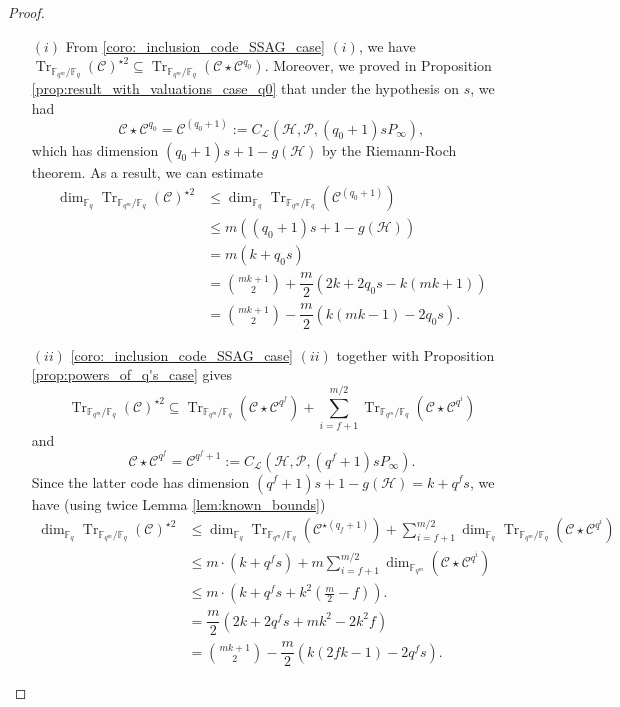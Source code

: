 \documentclass[a4paper]{article}
\newcommand{\calP}{\mathcal{P}}
\newcommand{\calH}{\mathcal{H}}
\newcommand{\calL}{\mathcal{L}}
\newcommand{\calC}{\mathcal{C}}
\newcommand{\fqm}{\mathbb{F}_{q^m}}
\newcommand{\fq}{\mathbb{F}_{q}}
\newcommand{\Tr}[1]{\operatorname{Tr}_{\mathbb{F}_{q^m}/\fq}\left(#1\right)}
\begin{document}
\begin{proof}
\begin{itemize}
    \item[$(i)$] From \ref{coro:_inclusion_code_SSAG_case} $(i)$, we have $\Tr{\calC}^{\star 2} \subseteq \Tr{\calC \star \calC^{q_0}}.$ Moreover, we proved in Proposition \ref{prop:result_with_valuations_case_q0} that under the hypothesis on $s$, we had
      \[ \calC \star \calC^{q_0} = \calC^{(q_0+1)} := C_{\calL}(\calH,\calP,(q_0+1)sP_{\infty}),\]
      which has dimension $(q_0+1)s + 1 - g(\calH)$ by the Riemann-Roch theorem. As a result, we can estimate
      \begin{align*}
           \dim_{\fq} \Tr{\calC}^{\star 2} &\leq \dim_{\fq} \Tr{\calC^{(q_0+1)}} \\
                                            & \leq m((q_0+1)s + 1 - g(\calH)) \\
                                            & = m (k+q_0 s) \\
                                            & = \binom{mk+1}{2} + \dfrac{m}{2}(2k+2q_0s-k(mk+1)) \\
                                            &= \binom{mk+1}{2} - \dfrac{m}{2} (k(mk-1)-2q_0s).
      \end{align*}
      \item[$(ii)$] \ref{coro:_inclusion_code_SSAG_case} $(ii)$ together with Proposition \ref{prop:powers_of_q's_case} gives 
       \[\Tr{\calC}^{\star 2} \subseteq \Tr{\calC \star \calC^{q^f}} + \sum\limits_{i=f+1}^{m/2} \Tr{\calC \star \calC^{q^i}}\]
       and 
        \[ \calC \star \calC^{q^f} = \calC^{q^f+1} := C_{\calL}(\calH,\calP,(q^f+1)sP_{\infty}).\]
        Since the latter code has dimension $(q^f+1)s+1-g(\calH)=k+q^fs$, we have (using twice Lemma \ref{lem:known_bounds})
         \begin{align*}
           \dim_{\fq}\Tr{\calC}^{\star 2} &\leq \dim_{\fq}\Tr{\calC^{\star(q_f+1)}} +  \sum\limits_{i=f+1}^{m/2} \dim_{\fq} \Tr{\calC \star \calC^{q^i}}\\
                                            &\leq m \cdot (k + q^fs) + m  \sum\limits_{i=f+1}^{m/2} \dim_{\fqm}(\calC \star \calC^{q^i}) \\
                                            &\leq m \cdot \left(k+q^fs + k^2 \left(\frac{m}{2}-f\right)\right). \\
                                            &= \dfrac{m}{2}(2k+2q^fs+mk^2-2k^2f) \\
                                         &=\binom{mk+1}{2}-\dfrac{m}{2}(k(2fk-1)-2q^fs).
      \end{align*}
\end{itemize}
\end{proof}
\end{document}
